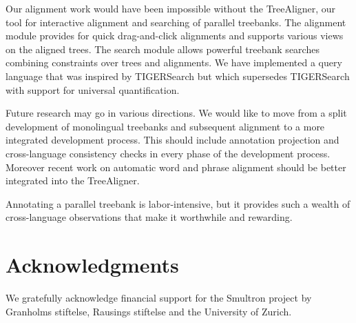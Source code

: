 \documentclass[output=paper]{LSP/langsci}
\begin{document}
Our alignment work would have been impossible without the TreeAligner, our tool for interactive alignment and searching of parallel treebanks. The alignment module provides for quick drag-and-click alignments and supports various views on the aligned trees. The search module allows powerful treebank searches combining constraints over trees and alignments. We have implemented a query language that was inspired by TIGERSearch but which supersedes TIGERSearch with support for universal quantification. 

Future research may go in various directions. We would like to move from a split development of monolingual treebanks and subsequent alignment to a more integrated development process. This should include annotation projection and cross-language consistency checks in every phase of the development process. Moreover recent work on automatic word and phrase alignment should be better integrated into the TreeAligner. 

Annotating a parallel treebank is labor-intensive, but it provides such a wealth of cross-language observations that make it worthwhile and rewarding. 

\section*{Acknowledgments}\label{sec:volk:5}

We gratefully acknowledge financial support for the Smultron project by Granholms stiftelse, Rausings stiftelse and the University of Zurich.

{\sloppy 
\printbibliography[heading=subbibliography,notkeyword=this]
}
\end{document}
